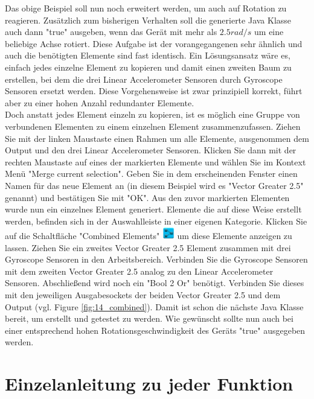 Das obige Beispiel soll nun noch erweitert werden, um auch auf Rotation zu reagieren. Zus\"atzlich zum bisherigen Verhalten soll die generierte Java Klasse auch dann "true" ausgeben, wenn das Ger\"at mit mehr als $2.5 rad/s$ um eine beliebige Achse rotiert. Diese Aufgabe ist der vorangegangenen sehr \"ahnlich und auch die ben\"otigten Elemente sind fast identisch. Ein L\"osungsansatz w\"are es, einfach jedes einzelne Element zu kopieren und damit einen zweiten Baum zu erstellen, bei dem die drei Linear Accelerometer Sensoren durch Gyroscope Sensoren ersetzt werden. Diese Vorgehensweise ist zwar prinzipiell korrekt, f\"uhrt aber zu einer hohen Anzahl redundanter Elemente.
\\
Doch anstatt jedes Element einzeln zu kopieren, ist es m\"oglich eine Gruppe von verbundenen Elementen zu einem einzelnen Element zusammenzufassen. Ziehen Sie mit der linken Maustaste einen Rahmen um alle Elemente, ausgenommen dem Output und den drei Linear Accelerometer Sensoren. Klicken Sie dann mit der rechten Maustaste auf eines der markierten Elemente und w\"ahlen Sie im Kontext Men\"u "Merge current selection". Geben Sie in dem erscheinenden Fenster einen Namen f\"ur das neue Element an (in diesem Beispiel wird es "Vector Greater 2.5" genannt) und best\"atigen Sie mit "OK". Aus den zuvor markierten Elementen wurde nun ein einzelnes Element generiert. Elemente die auf diese Weise erstellt werden, befinden sich in der Auswahlleiste in einer eigenen Kategorie. Klicken Sie auf die Schaltfl\"ache "Combined Elements" \includegraphics[width = 15pt]{Manual/combined_transf} um diese Elemente anzeigen zu lassen. Ziehen Sie ein zweites Vector Greater 2.5 Element zusammen mit drei Gyroscope Sensoren in den Arbeitsbereich. Verbinden Sie die Gyroscope Sensoren mit dem zweiten Vector Greater 2.5 analog zu den Linear Accelerometer Sensoren. Abschlie{\ss}end wird noch ein "Bool 2 Or" ben\"otigt. Verbinden Sie dieses mit den jeweiligen Ausgabesockets der beiden Vector Greater 2.5 und dem Output (vgl. Figure \ref{fig:14_combined}).
Damit ist schon die n\"achste Java Klasse bereit, um erstellt und getestet zu werden. Wie gew\"unscht sollte nun auch bei einer entsprechend hohen Rotationsgeschwindigkeit des Ger\"ats "true" ausgegeben werden.



\section{Einzelanleitung zu jeder Funktion}

